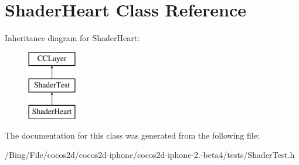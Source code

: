 \hypertarget{interface_shader_heart}{\section{Shader\-Heart Class Reference}
\label{interface_shader_heart}
}
Inheritance diagram for Shader\-Heart\-:\begin{figure}[H]
\begin{center}
\leavevmode
\includegraphics[height=3.000000cm]{interface_shader_heart}
\end{center}
\end{figure}


The documentation for this class was generated from the following file\-:\begin{DoxyCompactItemize}
\item 
/\-Bing/\-File/cocos2d/cocos2d-\/iphone/cocos2d-\/iphone-\/2.-\/beta4/tests/Shader\-Test.\-h\end{DoxyCompactItemize}
